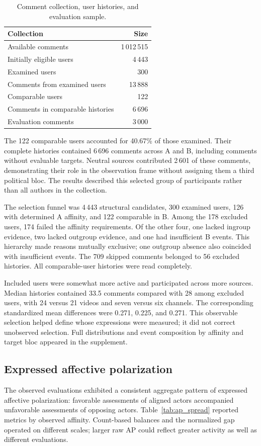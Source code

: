 \documentclass[conference,letterpaper]{IEEEtran}
\begin{document}
\begin{table}[t]
\centering\small
\caption{Comment collection, user histories, and evaluation sample.}
\label{tab:sentimiento_favorabilidad}
\begin{tabular}{lr}\toprule
Collection & Size\\\midrule
Available comments & 1\,012\,515\\
Initially eligible users & 4\,443\\
Examined users & 300\\
Comments from examined users & 13\,888\\
Comparable users & 122\\
Comments in comparable histories & 6\,696\\
Evaluation comments & 3\,000\\\bottomrule
\end{tabular}
\end{table}

The 122 comparable users accounted for 40.67\% of those examined. Their complete histories contained 6\,696 
comments across A and B, including comments without evaluable targets. Neutral sources contributed 2\,601 of 
these comments, demonstrating their role in the observation frame without assigning them a third political bloc.
The results described this selected group of participants rather than all authors in the collection.

The selection funnel was 4\,443 structural candidates, 300 examined users, 126 with determined A affinity, and 122 comparable in B. Among the 178 excluded users, 174 failed the affinity requirements. Of the other four, one lacked ingroup evidence, two lacked outgroup evidence, and one had insufficient B events. This hierarchy made reasons mutually exclusive; one outgroup absence also coincided with insufficient events. The 709 skipped comments belonged to 56 excluded histories. All comparable-user histories were read completely.

Included users were somewhat more active and participated across more sources. Median histories contained 33.5 comments compared with 28 among excluded users, with 24 versus 21 videos and seven versus six channels. The corresponding standardized mean differences were 0.271, 0.225, and 0.271. This observable selection helped define whose expressions were measured; it did not correct unobserved selection. Full distributions and event composition by affinity and target bloc appeared in the supplement.

\subsection{Expressed affective polarization}
The observed evaluations exhibited a consistent aggregate pattern of expressed affective polarization: favorable assessments of aligned actors accompanied unfavorable assessments of opposing actors. Table~\ref{tab:ap_spread} reported metrics by observed affinity. Count-based balances and the normalized gap operated on different scales; larger raw AP could reflect greater activity as well as different evaluations.
\end{document}
